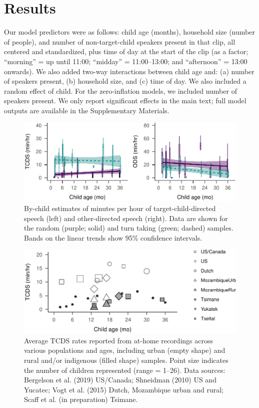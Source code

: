 \documentclass[floatsintext,man]{apa6}
\theoremstyle{definition}
\theoremstyle{definition}
\theoremstyle{definition}
\theoremstyle{remark}
\begin{document}
\section{Results}\label{results}

Our model predictors were as follows: child age (months), household size
(number of people), and number of non-target-child speakers present in
that clip, all centered and standardized, plus time of day at the start
of the clip (as a factor; \enquote{morning} = up until 11:00;
\enquote{midday} = 11:00--13:00; and \enquote{afternoon} = 13:00
onwards). We also added two-way interactions between child age and: (a)
number of speakers present, (b) household size, and (c) time of day. We
also included a random effect of child. For the zero-inflation models,
we included number of speakers present. We only report significant
effects in the main text; full model outputs are available in the
Supplementary Materials.

\begin{figure}
\centering
\includegraphics{Tseltal-CLE_files/figure-latex/fig3-1.pdf}
\caption{\label{fig:fig3}By-child estimates of minutes per hour of
target-child-directed speech (left) and other-directed speech (right).
Data are shown for the random (purple; solid) and turn taking (green;
dashed) samples. Bands on the linear trends show 95\% confidence
intervals.}
\end{figure}

\begin{figure}
\centering
\includegraphics{Tseltal-CLE_files/figure-latex/fig4-1.pdf}
\caption{\label{fig:fig4}Average TCDS rates reported from at-home recordings
across various populations and ages, including urban (empty shape) and
rural and/or indigenous (filled shape) samples. Point size indicates the
number of children represented (range = 1--26). Data sources: Bergelson
et al. (2019) US/Canada; Shneidman (2010) US and Yucatec; Vogt et al.
(2015) Dutch, Mozambique urban and rural; Scaff et al. (in preparation)
Tsimane.}
\end{figure}
\end{document}
